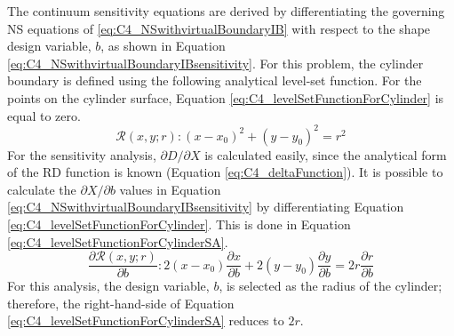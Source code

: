 %
The continuum sensitivity equations are derived by differentiating the governing NS equations of \eqref{eq:C4_NSwithvirtualBoundaryIB} with respect to the shape design variable, $b$, as shown in Equation \eqref{eq:C4_NSwithvirtualBoundaryIBsensitivity}. For this problem, the cylinder boundary is defined using the following analytical level-set function. For the points on the cylinder surface, Equation \eqref{eq:C4_levelSetFunctionForCylinder} is equal to zero.
%
\begin{equation}\label{eq:C4_levelSetFunctionForCylinder}
	\mathcal{R}(x, y; r): (x - x_0)^2 + (y - y_0)^2 = r^2
\end{equation}
%
For the sensitivity analysis, $\partial D/\partial X$ is calculated easily, since the analytical form of the RD function is known (Equation \eqref{eq:C4_deltaFunction}). It is possible to calculate the $\partial X/\partial b$ values in Equation \eqref{eq:C4_NSwithvirtualBoundaryIBsensitivity} by differentiating Equation \eqref{eq:C4_levelSetFunctionForCylinder}. This is done in Equation \eqref{eq:C4_levelSetFunctionForCylinderSA}.
%
\begin{equation}\label{eq:C4_levelSetFunctionForCylinderSA}
	\frac{\partial \mathcal{R}(x, y; r)}{\partial b}: 
	2 (x - x_0)\dfrac{\partial x}{\partial b} + 
	2 (y - y_0)\frac{\partial y}{\partial b} = 
	2 r \frac{\partial r}{\partial b}
\end{equation}
%
For this analysis, the design variable, $b$, is selected as the radius of the cylinder; therefore, the right-hand-side of Equation \eqref{eq:C4_levelSetFunctionForCylinderSA} reduces to $2r$.

